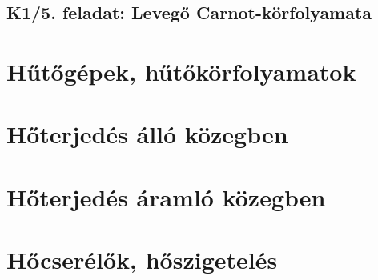 \documentclass[11pt, a4paper]{report}
\begin{document}
\section*{K1/5. feladat: Levegő Carnot-körfolyamata}



\chapter{Hűtőgépek, hűtőkörfolyamatok}



\chapter{Hőterjedés álló közegben}













\chapter{Hőterjedés áramló közegben}









\chapter{Hőcserélők, hőszigetelés}




\end{document}
